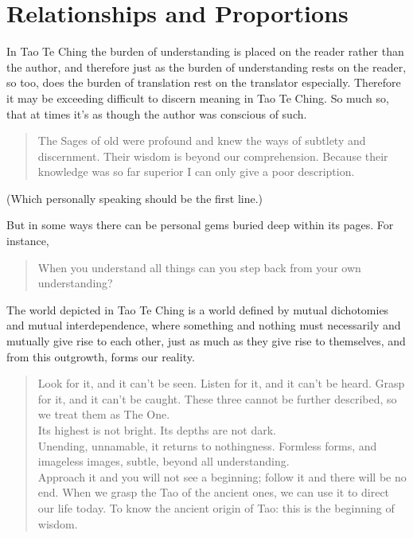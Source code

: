 \section{Relationships and Proportions}

In Tao Te Ching the burden of understanding is placed on the reader rather than the author, and therefore just as the burden of understanding rests on the reader, so too, does the burden of translation rest on the translator especially. Therefore it may be exceeding difficult to discern meaning in Tao Te Ching. So much so, that at times it’s as though the author was conscious of such. 

\begin{quotation}\noindent
The Sages of old were profound and knew the ways of subtlety and discernment.
Their wisdom is beyond our comprehension.
Because their knowledge was so far superior I can only give a poor description.
\end{quotation}

(Which personally speaking should be the first line.)

But in some ways there can be personal gems buried deep within its pages. For instance,
\begin{quotation}\noindent
When you understand all things can you step back from your own understanding? 
\end{quotation}

The world depicted in Tao Te Ching is a world defined by mutual dichotomies and mutual interdependence, where something and nothing must necessarily and mutually give rise to each other, just as much as they give rise to themselves, and from this outgrowth, forms our reality.

\begin{quotation}\noindent
Look for it, and it can't be seen.
Listen for it, and it can't be heard.
Grasp for it, and it can't be caught.
These three cannot be further described, so we treat them as The One.
\\
Its highest is not bright.
Its depths are not dark.
\\
Unending, unnamable, it returns to nothingness.
Formless forms, and imageless images, subtle, beyond all understanding.
\\
Approach it and you will not see a beginning; follow it and there will be no end.
When we grasp the Tao of the ancient ones, we can use it to direct our life today.
To know the ancient origin of Tao: this is the beginning of wisdom.
\end{quotation}


